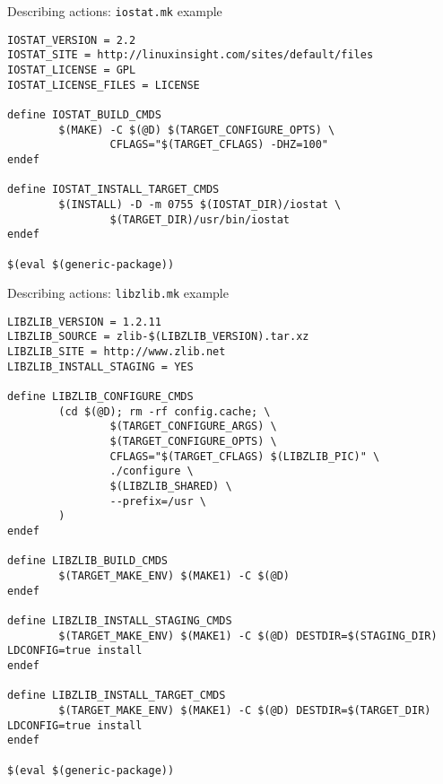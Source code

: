 \begin{frame}[fragile]{Describing actions: {\tt iostat.mk} example}
  \begin{block}{}
    \begin{verbatim}
IOSTAT_VERSION = 2.2
IOSTAT_SITE = http://linuxinsight.com/sites/default/files
IOSTAT_LICENSE = GPL
IOSTAT_LICENSE_FILES = LICENSE

define IOSTAT_BUILD_CMDS
        $(MAKE) -C $(@D) $(TARGET_CONFIGURE_OPTS) \
                CFLAGS="$(TARGET_CFLAGS) -DHZ=100"
endef

define IOSTAT_INSTALL_TARGET_CMDS
        $(INSTALL) -D -m 0755 $(IOSTAT_DIR)/iostat \
                $(TARGET_DIR)/usr/bin/iostat
endef

$(eval $(generic-package))
    \end{verbatim}
  \end{block}
\end{frame}

\begin{frame}[fragile]{Describing actions: {\tt libzlib.mk} example}
  \begin{block}{}
    \begin{verbatim}
LIBZLIB_VERSION = 1.2.11
LIBZLIB_SOURCE = zlib-$(LIBZLIB_VERSION).tar.xz
LIBZLIB_SITE = http://www.zlib.net
LIBZLIB_INSTALL_STAGING = YES

define LIBZLIB_CONFIGURE_CMDS
        (cd $(@D); rm -rf config.cache; \
                $(TARGET_CONFIGURE_ARGS) \
                $(TARGET_CONFIGURE_OPTS) \
                CFLAGS="$(TARGET_CFLAGS) $(LIBZLIB_PIC)" \
                ./configure \
                $(LIBZLIB_SHARED) \
                --prefix=/usr \
        )
endef

define LIBZLIB_BUILD_CMDS
        $(TARGET_MAKE_ENV) $(MAKE1) -C $(@D)
endef

define LIBZLIB_INSTALL_STAGING_CMDS
        $(TARGET_MAKE_ENV) $(MAKE1) -C $(@D) DESTDIR=$(STAGING_DIR) LDCONFIG=true install
endef

define LIBZLIB_INSTALL_TARGET_CMDS
        $(TARGET_MAKE_ENV) $(MAKE1) -C $(@D) DESTDIR=$(TARGET_DIR) LDCONFIG=true install
endef

$(eval $(generic-package))
    \end{verbatim}
  \end{block}
\end{frame}

